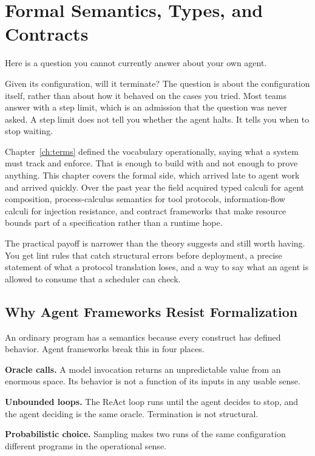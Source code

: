 \chapter{Formal Semantics, Types, and Contracts}
\label{ch:semantics}

Here is a question you cannot currently answer about your own agent.

Given its configuration, will it terminate? The question is about the
configuration itself, rather than about how it behaved on the cases you tried. Most teams answer with a step limit, which is an
admission that the question was never asked. A step limit does not tell you
whether the agent halts. It tells you when to stop waiting.

Chapter~\ref{ch:terms} defined the vocabulary operationally, saying what a system
must track and enforce. That is enough to build with and not enough to prove
anything. This chapter covers the formal side, which arrived late to agent work
and arrived quickly. Over the past year the field acquired typed calculi for
agent composition, process-calculus semantics for tool protocols, information-flow
calculi for injection resistance, and contract frameworks that make resource
bounds part of a specification rather than a runtime hope.

The practical payoff is narrower than the theory suggests and still worth having.
You get lint rules that catch structural errors before deployment, a precise
statement of what a protocol translation loses, and a way to say what an agent
is allowed to consume that a scheduler can check.

\section{Why Agent Frameworks Resist Formalization}

An ordinary program has a semantics because every construct has defined behavior.
Agent frameworks break this in four places.

\textbf{Oracle calls.} A model invocation returns an unpredictable value from an
enormous space. Its behavior is not a function of its inputs in any usable sense.

\textbf{Unbounded loops.} The ReAct loop runs until the agent decides to stop,
and the agent deciding is the same oracle. Termination is not structural.

\textbf{Probabilistic choice.} Sampling makes two runs of the same configuration
different programs in the operational sense.

